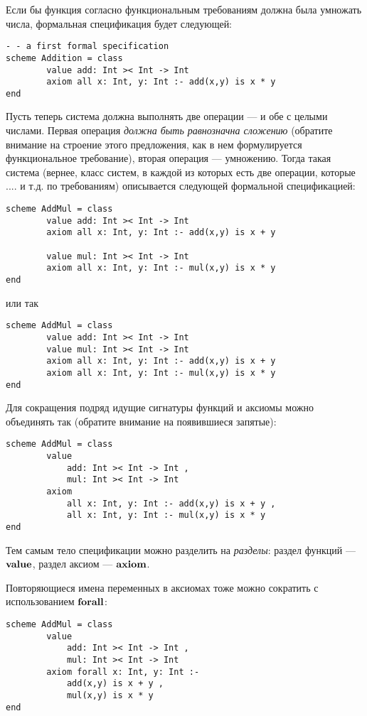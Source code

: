 \documentclass[12pt]{extreport}
\begin{document}
Если бы функция согласно функциональным требованиям должна была умножать числа, формальная спецификация будет следующей:
\begin{lstlisting}
- - a first formal specification
scheme Addition = class
        value add: Int >< Int -> Int
        axiom all x: Int, y: Int :- add(x,y) is x * y
end
\end{lstlisting}

Пусть теперь система должна выполнять две операции --- и обе с целыми числами. Первая операция \emph{должна быть равнозначна сложению} (обратите внимание на строение этого предложения, как в нем формулируется функциональное требование), вторая операция --- умножению. Тогда такая система (вернее, класс систем, в каждой из которых есть две операции, которые .... и т.д. по требованиям) описывается следующей формальной спецификацией:
\begin{lstlisting}
scheme AddMul = class
        value add: Int >< Int -> Int
        axiom all x: Int, y: Int :- add(x,y) is x + y

        value mul: Int >< Int -> Int
        axiom all x: Int, y: Int :- mul(x,y) is x * y
end
\end{lstlisting}

или так

\begin{lstlisting}
scheme AddMul = class
        value add: Int >< Int -> Int
        value mul: Int >< Int -> Int
        axiom all x: Int, y: Int :- add(x,y) is x + y
        axiom all x: Int, y: Int :- mul(x,y) is x * y
end
\end{lstlisting}

Для сокращения подряд идущие сигнатуры функций и аксиомы можно объединять так (обратите внимание на появившиеся запятые):
\begin{lstlisting}
scheme AddMul = class
        value
            add: Int >< Int -> Int ,
            mul: Int >< Int -> Int
        axiom
            all x: Int, y: Int :- add(x,y) is x + y ,
            all x: Int, y: Int :- mul(x,y) is x * y
end
\end{lstlisting}

Тем самым тело спецификации можно разделить на \emph{разделы}: раздел функций --- $\textbf{value}$, раздел аксиом --- $\mathop{\textbf{axiom}}$.

Повторяющиеся имена переменных в аксиомах тоже можно сократить с использованием $\textbf{forall}$:
\begin{lstlisting}
scheme AddMul = class
        value
            add: Int >< Int -> Int ,
            mul: Int >< Int -> Int
        axiom forall x: Int, y: Int :-
            add(x,y) is x + y ,
            mul(x,y) is x * y
end
\end{lstlisting}
\end{document}
